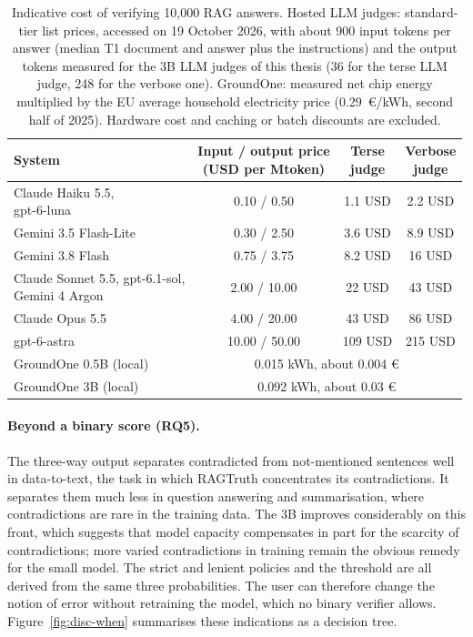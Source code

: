 \begin{table}[htbp]
\centering
\caption{Indicative cost of verifying 10{,}000 RAG answers. Hosted LLM judges: standard-tier list prices, accessed on 19
October 2026, with about 900 input tokens per answer (median T1 document and answer plus the instructions) and the
output tokens measured for the 3B LLM judges of this thesis (36 for the terse LLM judge, 248 for the verbose one). GroundOne:
measured net chip energy multiplied by the EU average household electricity price (0.29~€/kWh, second half of 2025).
Hardware cost and caching or batch discounts are excluded.}
\label{tab:disc-cost}
\small
\begin{tabular}{lccc}
\toprule
System & \makecell{Input / output price\\(USD per Mtoken)} & \makecell{Terse\\judge} & \makecell{Verbose\\judge} \\
\midrule
\makecell[l]{Claude Haiku 5.5,\\gpt-6-luna} & 0.10 / 0.50 & 1.1 USD & 2.2 USD \\
Gemini 3.5 Flash-Lite & 0.30 / 2.50 & 3.6 USD & 8.9 USD \\
Gemini 3.8 Flash & 0.75 / 3.75 & 8.2 USD & 16 USD \\
\makecell[l]{Claude Sonnet 5.5, gpt-6.1-sol,\\Gemini 4 Argon} & 2.00 / 10.00 & 22 USD & 43 USD \\
Claude Opus 5.5 & 4.00 / 20.00 & 43 USD & 86 USD \\
gpt-6-astra & 10.00 / 50.00 & 109 USD & 215 USD \\
\midrule
GroundOne 0.5B (local) & \multicolumn{3}{c}{0.015 kWh, about 0.004 €} \\
GroundOne 3B (local) & \multicolumn{3}{c}{0.092 kWh, about 0.03 €} \\
\bottomrule
\end{tabular}
\end{table}

\paragraph{Beyond a binary score (RQ5).} The three-way output separates contradicted from not-mentioned sentences well in
data-to-text, the task in which RAGTruth concentrates its contradictions. It separates them much less in question
answering and summarisation, where contradictions are rare in the training data. The 3B improves considerably on this front, which suggests that model capacity compensates in part for the scarcity of contradictions; more varied contradictions in training remain the obvious remedy for the small model. The strict and lenient policies and the threshold are all derived from the same three probabilities. The
user can therefore change the notion of error without retraining the model, which no binary verifier allows.
Figure~\ref{fig:disc-when} summarises these indications as a decision tree.


